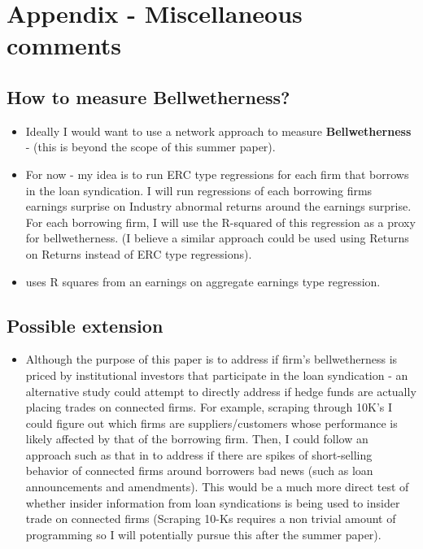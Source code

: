 \documentclass[english, 1p]{elsarticle}
\begin{document}
\pagebreak

\section{Appendix - Miscellaneous comments}

\subsection{How to measure Bellwetherness?}

\begin{itemize}
	\item Ideally I would want to use a network approach to measure \textbf{Bellwetherness} - (this is beyond the scope of this summer paper). 
	
	\item For now - my idea is to run ERC type regressions for each firm that borrows in the loan syndication. I will run regressions of each borrowing firms earnings surprise on Industry abnormal returns around the earnings surprise. For each borrowing firm, I will use the R-squared of this regression as a proxy for bellwetherness. (I believe a similar approach could be used using Returns on Returns instead of ERC type regressions).
	
	\item \cite{Tseng2014w} uses R squares from an earnings on aggregate earnings type regression.
\end{itemize} 

\subsection{Possible extension}
\begin{itemize}
	\item Although the purpose of this paper is to address if firm's bellwetherness is priced by institutional investors that participate in the loan syndication - an alternative study could attempt to directly address if hedge funds are actually placing trades on connected firms. For example, scraping through 10K's I could figure out which firms are suppliers/customers whose performance is likely affected by that of the borrowing firm. Then, I could follow an approach such as that in \cite{Massoud2011} to address if there are spikes of short-selling behavior of connected firms around borrowers bad news (such as loan announcements and amendments). This would be a much more direct test of whether insider information from loan syndications is being used to insider trade on connected firms (Scraping 10-Ks requires a non trivial amount of programming so I will potentially pursue this after the summer paper). 
\end{itemize} 
\end{document}
